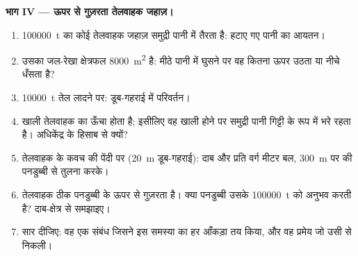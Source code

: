 \begin{problem}
\medskip
\noindent\textbf{भाग IV --- ऊपर से गुज़रता तेलवाहक जहाज़।}
\begin{enumerate}[resume]
  \item \qty{100000}{t} का कोई तेलवाहक जहाज़ समुद्री पानी में तैरता है:
        हटाए गए पानी का आयतन।
  \item उसका जल-रेखा क्षेत्रफल \qty{8000}{m^2} है: मीठे पानी में घुसने पर
        वह कितना ऊपर उठता या नीचे धँसता है?
  \item \qty{10000}{t} तेल लादने पर: डूब-गहराई में परिवर्तन।
  \item खाली तेलवाहक का  ऊँचा होता है; इसीलिए वह खाली
        होने पर समुद्री पानी गिट्टी के रूप में भरे रहता है। अधिकेंद्र के
        हिसाब से क्यों?
  \item तेलवाहक के कवच की पेंदी पर (\qty{20}{m} डूब-गहराई): दाब और प्रति
        वर्ग मीटर बल, \qty{300}{m} पर की पनडुब्बी से तुलना करके।
  \item तेलवाहक ठीक पनडुब्बी के ऊपर से गुज़रता है। क्या पनडुब्बी उसके
        \qty{100000}{t} को अनुभव करती है? दाब-क्षेत्र से समझाइए।
  \item सार दीजिए: वह एक संबंध जिसने इस समस्या का हर आँकड़ा तय किया, और
        वह प्रमेय जो उसी से निकली।
\end{enumerate}
\end{problem}
